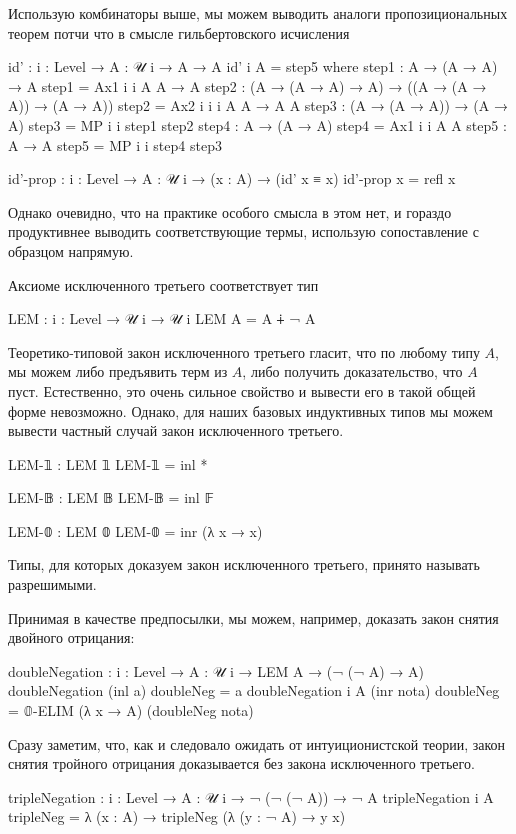 \documentclass{article}[12pt]
\begin{document}
Использую комбинаторы выше, мы можем выводить аналоги пропозициональных теорем потчи что
в смысле гильбертовского исчисления
\begin{code}
id' : {i : Level} → {A : 𝒰 i} → A → A
id' {i} {A} = step5
    where
        step1 : A → (A → A) → A
        step1 = Ax1 {i} {i} {A} {A → A}
        step2 : (A → (A → A) → A) → ((A → (A → A)) → (A → A))
        step2 = Ax2 {i} {i} {i} {A} {A → A} {A}
        step3 : (A → (A → A)) → (A → A)
        step3 = MP {i} {i} step1 step2
        step4 : A → (A → A)
        step4 = Ax1 {i} {i} {A} {A}
        step5 : A → A
        step5 = MP {i} {i} step4 step3

id'-prop : {i : Level} → {A : 𝒰 i}
           → (x : A) → (id' x ≡ x)
id'-prop x = refl x
\end{code}
Однако очевидно, что на практике особого смысла в этом нет, и гораздо продуктивнее
выводить соответствующие термы, использую сопоставление с образцом напрямую.

Аксиоме исключенного третьего соответствует тип
\begin{code}
LEM : {i : Level} → 𝒰 i → 𝒰 i
LEM A = A ∔ ¬ A
\end{code}
Теоретико-типовой закон исключенного третьего гласит, что по любому типу $A$, мы можем
либо предъявить терм из $A$, либо получить доказательство, что $A$ пуст. Естественно,
это очень сильное свойство и вывести его в такой общей форме невозможно. Однако, для наших
базовых индуктивных типов мы можем вывести частный случай закон исключенного третьего.
\begin{code}
LEM-𝟙 : LEM 𝟙
LEM-𝟙 = inl *

LEM-𝔹 : LEM 𝔹
LEM-𝔹 = inl 𝔽

LEM-𝟘 : LEM 𝟘
LEM-𝟘 = inr (λ x → x)
\end{code}
Типы, для которых доказуем закон исключенного третьего, принято называть разрешимыми.

Принимая  в качестве предпосылки, мы можем, например, доказать
закон снятия двойного отрицания:
\begin{code}
doubleNegation : {i : Level} → {A : 𝒰 i} → LEM A → (¬ (¬ A) → A)
doubleNegation (inl a) doubleNeg = a
doubleNegation {i} {A} (inr nota) doubleNeg = 𝟘-ELIM (λ x → A) (doubleNeg nota)
\end{code}
Сразу заметим, что, как и следовало ожидать от интуиционистской теории, закон
снятия тройного отрицания доказывается без закона исключенного третьего.
\begin{code}
tripleNegation : {i : Level} → {A : 𝒰 i} → ¬ (¬ (¬ A)) → ¬ A
tripleNegation {i} {A} tripleNeg = λ (x : A)  → tripleNeg (λ (y : ¬ A) → y x)
\end{code} 
\end{document}
